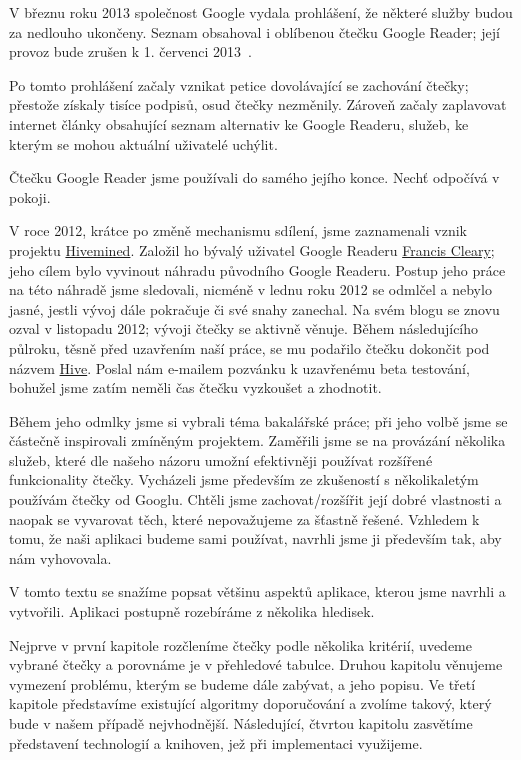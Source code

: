 
V březnu roku 2013 společnost Google vydala prohlášení, že některé služby budou za nedlouho ukončeny.
Seznam obsahoval i oblíbenou čtečku Google Reader; její provoz bude zrušen k 1. červenci 2013~\cite{google-reader-down}.

Po tomto prohlášení začaly vznikat petice dovolávající se zachování čtečky; přestože získaly tisíce podpisů, osud čtečky nezměnily.
Zároveň začaly zaplavovat internet články obsahující seznam alternativ ke Google Readeru, služeb, ke kterým se mohou aktuální uživatelé uchýlit.

Čtečku Google Reader jsme používali do samého jejího konce.
Nechť odpočívá v pokoji.


V roce 2012, krátce po změně mechanismu sdílení, jsme zaznamenali vznik projektu \href{http://hiveminedblog.tumblr.com/}{Hivemined}.
Založil ho bývalý uživatel Google Readeru \href{mailto:apodysophilia@gmail.com}{Francis Cleary}; jeho cílem bylo vyvinout náhradu původního Google Readeru.
Postup jeho práce na této náhradě jsme sledovali, nicméně v lednu roku 2012 se odmlčel a nebylo jasné, jestli vývoj dále pokračuje či své snahy zanechal.
Na svém blogu se znovu ozval v listopadu 2012; vývoji čtečky se aktivně věnuje.
Během následujícího půlroku, těsně před uzavřením naší práce, se mu podařilo čtečku dokončit pod názvem \href{http://hivereader.com/}{Hive}.
Poslal nám e-mailem pozvánku k uzavřenému beta testování, bohužel jsme zatím neměli čas čtečku vyzkoušet a zhodnotit.

Během jeho odmlky jsme si vybrali téma bakalářské práce; při jeho volbě jsme se částečně inspirovali zmíněným projektem.
Zaměřili jsme se na provázání několika služeb, které dle našeho názoru umožní efektivněji používat rozšířené funkcionality čtečky.
Vycházeli jsme především ze zkušeností s několikaletým používám čtečky od Googlu.
Chtěli jsme zachovat/rozšířit její dobré vlastnosti a naopak se vyvarovat těch, které nepovažujeme za šťastně řešené.
Vzhledem k tomu, že naši aplikaci budeme sami používat, navrhli jsme ji především tak, aby nám vyhovovala.


V tomto textu se snažíme popsat většinu aspektů aplikace, kterou jsme navrhli a vytvořili.
Aplikaci postupně rozebíráme z několika hledisek.

Nejprve v první kapitole rozčleníme čtečky podle několika kritérií, uvedeme vybrané čtečky a porovnáme je v přehledové tabulce.
Druhou kapitolu věnujeme vymezení problému, kterým se budeme dále zabývat, a jeho popisu.
Ve třetí kapitole představíme existující algoritmy doporučování a zvolíme takový, který bude v našem případě nejvhodnější.
Následující, čtvrtou kapitolu zasvětíme představení technologií a knihoven, jež při implementaci využijeme.

